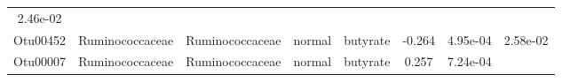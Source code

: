 \documentclass[11pt,]{article}
\begin{document}
\begin{longtable}[]{@{}cccccccc@{}}
\begin{minipage}[t]{0.08\columnwidth}
2.46e-02\strut
\end{minipage}\tabularnewline
\begin{minipage}[t]{0.08\columnwidth}\centering\strut
Otu00452\strut
\end{minipage} & \begin{minipage}[t]{0.15\columnwidth}\centering\strut
Ruminococcaceae\strut
\end{minipage} & \begin{minipage}[t]{0.15\columnwidth}\centering\strut
Ruminococcaceae\strut
\end{minipage} & \begin{minipage}[t]{0.08\columnwidth}\centering\strut
normal\strut
\end{minipage} & \begin{minipage}[t]{0.09\columnwidth}\centering\strut
butyrate\strut
\end{minipage} & \begin{minipage}[t]{0.07\columnwidth}\centering\strut
-0.264\strut
\end{minipage} & \begin{minipage}[t]{0.08\columnwidth}\centering\strut
4.95e-04\strut
\end{minipage} & \begin{minipage}[t]{0.08\columnwidth}\centering\strut
2.58e-02\strut
\end{minipage}\tabularnewline
\begin{minipage}[t]{0.08\columnwidth}\centering\strut
Otu00007\strut
\end{minipage} & \begin{minipage}[t]{0.15\columnwidth}\centering\strut
Ruminococcaceae\strut
\end{minipage} & \begin{minipage}[t]{0.15\columnwidth}\centering\strut
Ruminococcaceae\strut
\end{minipage} & \begin{minipage}[t]{0.08\columnwidth}\centering\strut
normal\strut
\end{minipage} & \begin{minipage}[t]{0.09\columnwidth}\centering\strut
butyrate\strut
\end{minipage} & \begin{minipage}[t]{0.07\columnwidth}\centering\strut
0.257\strut
\end{minipage} & \begin{minipage}[t]{0.08\columnwidth}\centering\strut
7.24e-04\strut
\end{minipage} & \begin{minipage}[t]{0.08\columnwidth}\centering\strut

\end{minipage}
\end{longtable}
\end{document}
